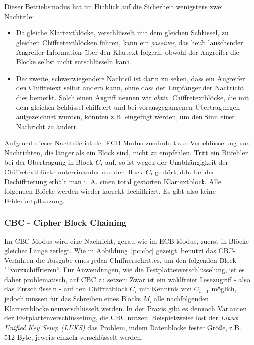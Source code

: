 Dieser Betriebsmodus hat im Hinblick auf die Sicherheit wenigstens zwei Nachteile:
\begin{itemize}
	\item Da gleiche Klartextblöcke, verschlüsselt mit dem gleichen Schlüssel, zu gleichen Chiffretextblöcken führen, kann ein \emph{passiver}, das heißt lauschender Angreifer
	Information über den Klartext folgern, obwohl der Angreifer die Blöcke selbst nicht entschlüsseln kann.
	\item Der zweite, schwerwiegendere Nachteil ist darin zu sehen, dass ein Angreifer den Chiffretext selbst ändern kann, ohne dass der Empfänger der
	Nachricht dies bemerkt. Solch einen Angriff nennen wir \emph{aktiv}. Chiffretextblöcke, die mit dem gleichen Schlüssel chiffriert und bei vorausgegangenen Übertragungen aufgezeichnet wurden, könnten
	z.B. eingefügt werden, um den Sinn einer Nachricht zu ändern.
\end{itemize}

Aufgrund dieser Nachteile ist der ECB-Modus zumindest zur Verschlüsselung von Nachrichten, die länger als ein Block sind, nicht zu empfehlen.
Tritt ein Bitfehler bei der Übertragung in Block $C_i$ auf, so ist wegen der Unabhängigkeit der Chiffretextblöcke untereinander nur der Block
$C_i$ gestört, d.h. bei der Dechiffrierung erhält man i. A. einen total gestörten Klartextblock. Alle folgenden Blöcke werden wieder korrekt
dechiffriert. Es gibt also keine Fehlerfortpflanzung.

\subsubsection{CBC - Cipher Block Chaining}\label{ssec:cbc}
Im CBC-Modus wird eine Nachricht, genau wie im ECB-Modus, zuerst in Blöcke gleicher Länge zerlegt. Wie in Abbildung~\ref{pc:cbc} gezeigt, benutzt das CBC-Verfahren die Ausgabe eines jeden Chiffrierschrittes, um den folgenden Block "`vorzuchiffrieren``.
Für Anwendungen, wie die Festplattenverschlüsselung, ist es daher problematisch, auf CBC zu setzen: Zwar ist ein wahlfreier Lesezugriff - also das Entschlüsseln - auf den Chiffratblock $C_i$ mit Kenntnis von $C_{i-1}$ möglich, jedoch müssen für das Schreiben eines Blocks $M_i$ alle nachfolgenden Klartextblöcke neuverschlüsselt werden. In der Praxis gibt es dennoch Varianten der Festplattenverschlüsselung, die CBC nutzen.
Beispielsweise löst der \textit{Linux Unified Key Setup (LUKS)} das Problem, indem Datenblöcke fester Größe, z.B. 512 Byte, jeweils einzeln verschlüsselt werden.

